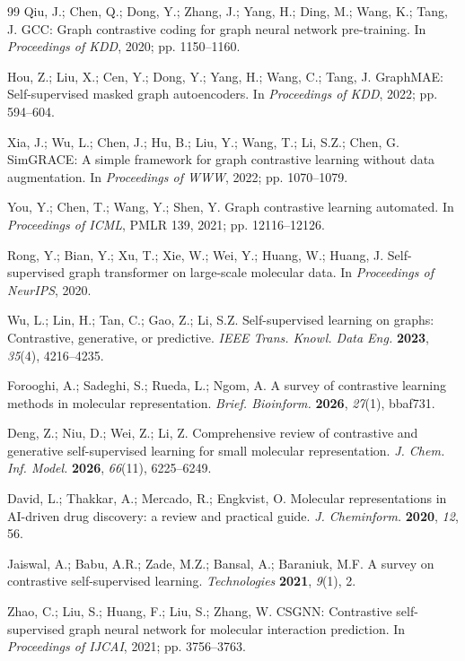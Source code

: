 \documentclass[10pt,a4paper,twocolumn]{article}
\begin{document}
\begin{thebibliography}{99}
Qiu, J.; Chen, Q.; Dong, Y.; Zhang, J.; Yang, H.; Ding, M.; Wang, K.; Tang, J. GCC: Graph contrastive coding for graph neural network pre-training. In \textit{Proceedings of KDD}, 2020; pp. 1150--1160.


Hou, Z.; Liu, X.; Cen, Y.; Dong, Y.; Yang, H.; Wang, C.; Tang, J. GraphMAE: Self-supervised masked graph autoencoders. In \textit{Proceedings of KDD}, 2022; pp. 594--604.


Xia, J.; Wu, L.; Chen, J.; Hu, B.; Liu, Y.; Wang, T.; Li, S.Z.; Chen, G. SimGRACE: A simple framework for graph contrastive learning without data augmentation. In \textit{Proceedings of WWW}, 2022; pp. 1070--1079.


You, Y.; Chen, T.; Wang, Y.; Shen, Y. Graph contrastive learning automated. In \textit{Proceedings of ICML}, PMLR 139, 2021; pp. 12116--12126.


Rong, Y.; Bian, Y.; Xu, T.; Xie, W.; Wei, Y.; Huang, W.; Huang, J. Self-supervised graph transformer on large-scale molecular data. In \textit{Proceedings of NeurIPS}, 2020.


Wu, L.; Lin, H.; Tan, C.; Gao, Z.; Li, S.Z. Self-supervised learning on graphs: Contrastive, generative, or predictive. \textit{IEEE Trans. Knowl. Data Eng.} \textbf{2023}, \textit{35}(4), 4216--4235.


Forooghi, A.; Sadeghi, S.; Rueda, L.; Ngom, A. A survey of contrastive learning methods in molecular representation. \textit{Brief. Bioinform.} \textbf{2026}, \textit{27}(1), bbaf731.


Deng, Z.; Niu, D.; Wei, Z.; Li, Z. Comprehensive review of contrastive and generative self-supervised learning for small molecular representation. \textit{J. Chem. Inf. Model.} \textbf{2026}, \textit{66}(11), 6225--6249.

David, L.; Thakkar, A.; Mercado, R.; Engkvist, O. Molecular representations in AI-driven drug discovery: a review and practical guide. \textit{J. Cheminform.} \textbf{2020}, \textit{12}, 56.


Jaiswal, A.; Babu, A.R.; Zade, M.Z.; Bansal, A.; Baraniuk, M.F. A survey on contrastive self-supervised learning. \textit{Technologies} \textbf{2021}, \textit{9}(1), 2.


Zhao, C.; Liu, S.; Huang, F.; Liu, S.; Zhang, W. CSGNN: Contrastive self-supervised graph neural network for molecular interaction prediction. In \textit{Proceedings of IJCAI}, 2021; pp. 3756--3763.



\end{thebibliography}
\end{document}
